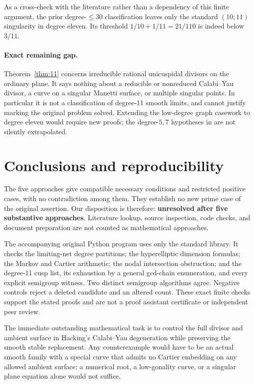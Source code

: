 \documentclass[11pt]{article}
\theoremstyle{remark}\newtheorem{remark}[theorem]{Remark}
\begin{document}
As a cross-check with the literature rather than a dependency of this finite argument, the prior degree-$\leq30$ classification \cite[Thm.~5.1, Table~7]{DSi} leaves only the standard $(10;11)$ singularity in degree eleven. Its threshold $1/10+1/11=21/110$ is indeed below $3/11$.

\paragraph{Exact remaining gap.}
Theorem~\ref{thm:11} concerns irreducible rational unicuspidal divisors on the ordinary plane. It says nothing about a reducible or nonreduced Calabi--Yau divisor, a curve on a singular Manetti surface, or multiple singular points. In particular it is not a classification of degree-11 smooth limits, and cannot justify marking the original problem solved. Extending the low-degree graph casework to degree eleven would require new proofs; the degree-$5,7$ hypotheses in \cite{DS} are not silently extrapolated.

\section{Conclusions and reproducibility}
The five approaches give compatible necessary conditions and restricted positive cases, with no contradiction among them. They establish no new prime case of the original assertion. Our disposition is therefore: \textbf{unresolved after five substantive approaches}. Literature lookup, source inspection, code checks, and document preparation are not counted as mathematical approaches.

The accompanying original Python program uses only the standard library. It checks the limiting-net degree partitions; the hyperelliptic dimension formulas; the Markov and Cartier arithmetic; the nodal intersection obstruction; and the degree-11 cusp list, its exhaustion by a general gcd-chain enumeration, and every explicit semigroup witness. Two distinct semigroup algorithms agree. Negative controls reject a deleted candidate and an altered count. These exact finite checks support the stated proofs and are not a proof assistant certificate or independent peer review.

The immediate outstanding mathematical task is to control the full divisor and ambient surface in Hacking's Calabi--Yau degeneration while preserving the smooth stable replacement. Any counterexample would have to be an actual smooth family with a special curve that admits no Cartier embedding on any allowed ambient surface; a numerical root, a low-gonality curve, or a singular plane equation alone would not suffice.
\end{document}
